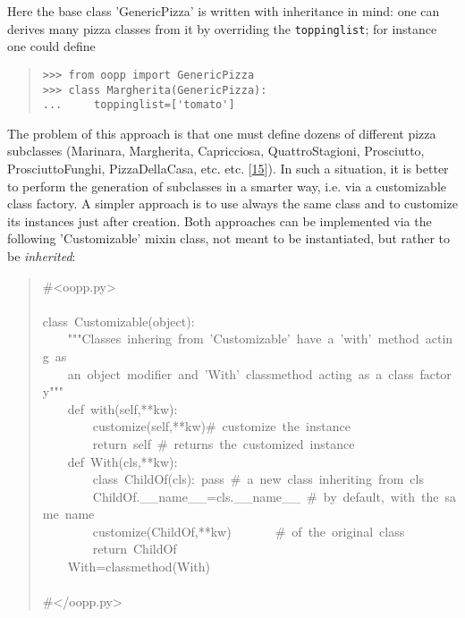 \documentclass[10pt,english]{article}
\begin{document}
Here the base class 'GenericPizza' is written with inheritance in mind: one
can derives many pizza classes from it by overriding the \texttt{toppinglist};
for instance one could define
\begin{quote}
\begin{verbatim}>>> from oopp import GenericPizza
>>> class Margherita(GenericPizza): 
...     toppinglist=['tomato']\end{verbatim}
\end{quote}

The problem of this approach is that one must define dozens of 
different pizza subclasses (Marinara, Margherita, Capricciosa, QuattroStagioni, 
Prosciutto, ProsciuttoFunghi, PizzaDellaCasa, etc. etc. [\hyperlink{id30}{15}]). In such a 
situation, it is better to perform the generation of subclasses in a smarter 
way, i.e. via a customizable class factory.
A simpler approach is to use always the same class and to customize
its instances just after creation. Both approaches can be implemented via
the following 'Customizable' mixin class, not meant to be instantiated, 
but rather to be \emph{inherited}:
\begin{quote}
\begin{ttfamily}\begin{flushleft}
\mbox{{\#}<oopp.py>}\\
\mbox{}\\
\mbox{class~Customizable(object):}\\
\mbox{~~~~"""Classes~inhering~from~'Customizable'~have~a~'with'~method~acting~as}\\
\mbox{~~~~an~object~modifier~and~'With'~classmethod~acting~as~a~class~factory"""}\\
\mbox{~~~~def~with(self,**kw):}\\
\mbox{~~~~~~~~customize(self,**kw){\#}~customize~the~instance}\\
\mbox{~~~~~~~~return~self~{\#}~returns~the~customized~instance}\\
\mbox{~~~~def~With(cls,**kw):}\\
\mbox{~~~~~~~~class~ChildOf(cls):~pass~{\#}~a~new~class~inheriting~from~cls}\\
\mbox{~~~~~~~~ChildOf.{\_}{\_}name{\_}{\_}=cls.{\_}{\_}name{\_}{\_}~{\#}~by~default,~with~the~same~name}\\
\mbox{~~~~~~~~customize(ChildOf,**kw)~~~~~~~{\#}~of~the~original~class}\\
\mbox{~~~~~~~~return~ChildOf}\\
\mbox{~~~~With=classmethod(With)~}\\
\mbox{}\\
\mbox{{\#}</oopp.py>}
\end{flushleft}\end{ttfamily}
\end{quote}
\end{document}
